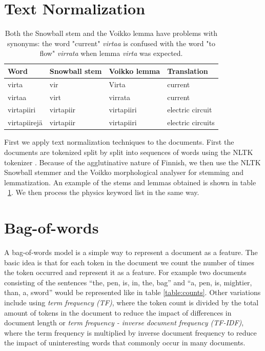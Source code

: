 \documentclass[utf8,english]{gradu3}
\begin{document}
\section{Text Normalization}

\begin{table}[]
  \begin{tabular}{ | l | l | l | l | }
  \hline
  \textbf{Word} & \textbf{Snowball stem} & \textbf{Voikko lemma} & \textbf{Translation} \\ \hline
  virta & vir & Virta & current\\ \hline
  virtaa & virt & virrata & current\\ \hline
  virtapiiri & virtapiir & virtapiiri & electric circuit\\ \hline
  virtapiirejä & virtapiir & virtapiiri & electric circuits\\
  \hline
  \end{tabular}
  \caption{Both the Snowball stem and the Voikko lemma have problems with synonyms: the word "current" \emph{virtaa} is confused with the word "to flow" \emph{virrata} when lemma \emph{virta} was expected.}
  \label{table:stemmer}
\end{table}

First we apply text normalization techniques to the documents. First the documents are tokenized split by split into sequences of words using the NLTK tokenizer \parencite{birdNaturalLanguageProcessing2009}. Because of the agglutinative nature of Finnish, we then use the NLTK Snowball stemmer \parencite{birdNaturalLanguageProcessing2009} and the Voikko morphological analyser \parencite{pitkanenVoikkoFreeLinguistic2019}  for stemming and lemmatization. An example of the stems and lemmas obtained is shown in table ~\ref{table:stemmer}. We then process the physics keyword list in the same way. 

\section{Bag-of-words}
A bag-of-words model is a simple way to represent a document as a feature. The basic idea is that for each token in the document we count the number of times the token occurred and represent it as a feature. For example two documents consisting of the sentences \enquote{the, pen, is, in, the, bag} and \enquote{a, pen, is, mightier, than, a, sword} would be represented like in table \ref{table:counts}. Other variations include using \emph{term frequency (TF)}, where the token count is divided by the total amount of tokens in the document to reduce the impact of differences in document length or \emph{term frequency - inverse document frequency (TF-IDF)}, where the term frequency is multiplied by inverse document frequency to reduce the impact of uninteresting words that commonly occur in many documents. 
\end{document}
